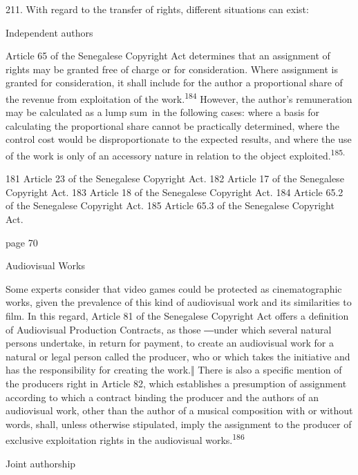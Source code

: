 \documentclass[
]{article}
\begin{document}
{211. }{With regard to the transfer of rights, different situations can
exist:}

{Independent authors}

{Article 65 of the Senegalese }{Copyright Act }{determines that an
assignment of rights may be granted free of charge or for consideration.
Where assignment is granted for consideration, it shall include for the
author a proportional share of the revenue from exploitation of the
work.}\textsuperscript{{184 }}{However, the author's remuneration may be
calculated as a }{lump sum}{~}{in the following cases: where a basis for
calculating the proportional share cannot be practically determined,
where the control cost would be disproportionate to the expected
results, and where the use of the work is only of an accessory nature in
relation to the object exploited.}\textsuperscript{{185.}}

{181 }{Article 23 of the Senegalese }{Copyright Act}{. }{182 }{Article
17 of the Senegalese }{Copyright Act}{. }{183 }{Article 18 of the
Senegalese }{Copyright Act}{. }{184 }{Article 65.2 of the Senegalese
}{Copyright Act}{. }{185 }{Article 65.3 of the Senegalese }{Copyright
Act}{.}

{page 70}

{Audiovisual Works}

{Some experts consider that video games could be protected as
cinematographic works, given the prevalence of this kind of audiovisual
work and its similarities to film. In this regard, Article 81 of the
Senegalese }{Copyright Act }{offers a definition of }{Audiovisual
Production Contracts}{, as those ―}{under which several natural persons
undertake, in return for payment, to create an audiovisual work for a
natural or legal person called the producer, who or which takes the
initiative and has the responsibility for creating the work.}{‖ There is
also a specific mention of the pr}{oducers right in Article 82, which
establishes a presumption of assignment according to which a contract
binding the producer and the authors of an audiovisual work, other than
the author of a musical composition with or without words, shall, unless
otherwise stipulated, imply the assignment to the producer of exclusive
exploitation rights in the audiovisual works.}\textsuperscript{{186}}

{Joint authorship}
\end{document}

